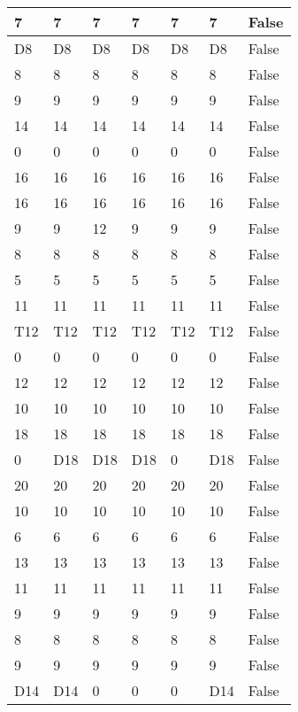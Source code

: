 \begin{longtable}[htbp]{| p{} | p{} | p{}| p{}| p{}| p{}| p{}|}
7 & 7 & 7 & 7 & 7 & 7 & False \\ \hline
\multicolumn{1}{|l|}{D8} & \multicolumn{1}{l|}{D8} & \multicolumn{1}{l|}{D8} & \multicolumn{1}{l|}{D8} & \multicolumn{1}{l|}{D8} & \multicolumn{1}{l|}{D8} & False \\ \hline
8 & 8 & 8 & 8 & 8 & 8 & False \\ \hline
9 & 9 & 9 & 9 & 9 & 9 & False \\ \hline
14 & 14 & 14 & 14 & 14 & 14 & False \\ \hline
0 & 0 & 0 & 0 & 0 & 0 & False \\ \hline
16 & 16 & 16 & 16 & 16 & 16 & False \\ \hline
16 & 16 & 16 & 16 & 16 & 16 & False \\ \hline
9 & 9 & 12 & 9 & 9 & 9 & False \\ \hline
8 & 8 & 8 & 8 & 8 & 8 & False \\ \hline
5 & 5 & 5 & 5 & 5 & 5 & False \\ \hline
11 & 11 & 11 & 11 & 11 & 11 & False \\ \hline
\multicolumn{1}{|l|}{T12} & \multicolumn{1}{l|}{T12} & \multicolumn{1}{l|}{T12} & \multicolumn{1}{l|}{T12} & \multicolumn{1}{l|}{T12} & \multicolumn{1}{l|}{T12} & False \\ \hline
0 & 0 & 0 & 0 & 0 & 0 & False \\ \hline
12 & 12 & 12 & 12 & 12 & 12 & False \\ \hline
10 & 10 & 10 & 10 & 10 & 10 & False \\ \hline
18 & 18 & 18 & 18 & 18 & 18 & False \\ \hline
0 & \multicolumn{1}{l|}{D18} & \multicolumn{1}{l|}{D18} & \multicolumn{1}{l|}{D18} & 0 & \multicolumn{1}{l|}{D18} & False \\ \hline
20 & 20 & 20 & 20 & 20 & 20 & False \\ \hline
10 & 10 & 10 & 10 & 10 & 10 & False \\ \hline
6 & 6 & 6 & 6 & 6 & 6 & False \\ \hline
13 & 13 & 13 & 13 & 13 & 13 & False \\ \hline
11 & 11 & 11 & 11 & 11 & 11 & False \\ \hline
9 & 9 & 9 & 9 & 9 & 9 & False \\ \hline
8 & 8 & 8 & 8 & 8 & 8 & False \\ \hline
9 & 9 & 9 & 9 & 9 & 9 & False \\ \hline
\multicolumn{1}{|l|}{D14} & \multicolumn{1}{l|}{D14} & 0 & 0 & 0 & \multicolumn{1}{l|}{D14} & False \\ \hline

\end{longtable}
